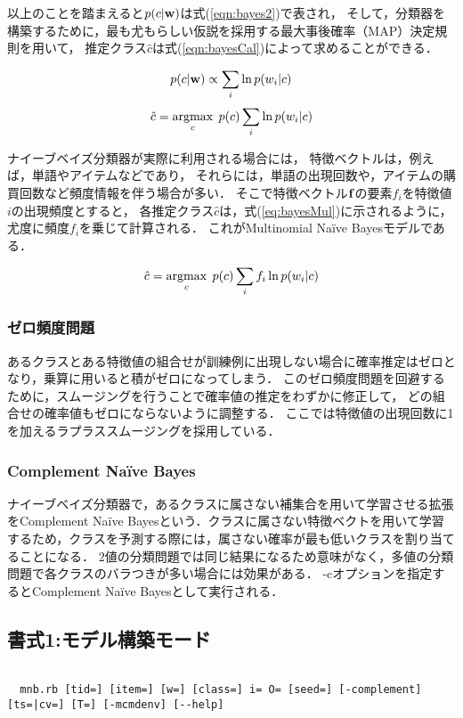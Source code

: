 以上のことを踏まえると$p(c|{\bf w})$は式(\ref{eqn:bayes2})で表され，
そして，分類器を構築するために，最も尤もらしい仮説を採用する最大事後確率（MAP）決定規則を用いて，
推定クラス${\hat c}$は式(\ref{eqn:bayesCal})によって求めることができる．

\begin{equation}
p(c|{\bf w}) \propto \sum_i \ln{p(w_i|c)}
\label{eqn:bayes2}
\end{equation}
%
\begin{equation}
{\hat c}=\mathop{\rm argmax}\limits_{c} \; p(c)\sum_i \ln{p(w_i|c)}
\label{eqn:bayesCal}
\end{equation}

ナイーブベイズ分類器が実際に利用される場合には，
特徴ベクトルは，例えば，単語やアイテムなどであり，
それらには，単語の出現回数や，アイテムの購買回数など頻度情報を伴う場合が多い．
そこで特徴ベクトル${\bf f}$の要素$f_i$を特徴値$i$の出現頻度とすると，
各推定クラス${\hat c}$は，式(\ref{eq:bayesMul})に示されるように，
尤度に頻度$f_i$を乗じて計算される．
これがMultinomial Na{\"i}ve Bayesモデルである．

\begin{equation}
{\hat c}=\mathop{\rm argmax}\limits_{c} \; p(c)\sum_i f_i \ln{p(w_i|c})
\label{eq:bayesMul}
\end{equation}

\subsubsection{ゼロ頻度問題}
あるクラスとある特徴値の組合せが訓練例に出現しない場合に確率推定はゼロとなり，乗算に用いると積がゼロになってしまう．
このゼロ頻度問題を回避するために，スムージングを行うことで確率値の推定をわずかに修正して，
どの組合せの確率値もゼロにならないように調整する．
ここでは特徴値の出現回数に1を加えるラプラススムージングを採用している．

\subsubsection{Complement Na{\"i}ve Bayes}
ナイーブベイズ分類器で，あるクラスに属さない補集合を用いて学習させる拡張をComplement Na{\"i}ve Bayesという．クラスに属さない特徴ベクトを用いて学習するため，クラスを予測する際には，属さない確率が最も低いクラスを割り当てることになる．
2値の分類問題では同じ結果になるため意味がなく，多値の分類問題で各クラスのバラつきが多い場合には効果がある．
-cオプションを指定するとComplement Na{\"i}ve Bayesとして実行される．

\subsection{書式1:モデル構築モード}
\begin{verbatim}

  mnb.rb [tid=] [item=] [w=] [class=] i= O= [seed=] [-complement] [ts=|cv=] [T=] [-mcmdenv] [--help]

\end{verbatim}

